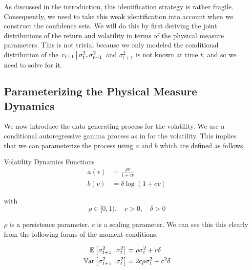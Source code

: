 \documentclass[11pt, letterpaper, twoside, final]{article}
\begin{document}
As discussed in the introduction, this identification strategy is rather fragile.
Consequently, we need to take this weak identification into account when we construct the confidence sets.
We will do this by first deriving the joint distributions of the return and volatility in terms of the physical
measure parameters.
This is not trivial because we only modeled the conditional distribution of the $\left. r_{t+1} \,\middle\vert\, \sigma^2_{t},
\sigma^2_{t+1} \right.$  and $\sigma^2_{t+1}$ is not known at time $t$, and so we need to solve for it.


\subsection{Parameterizing the Physical Measure Dynamics}

We now introduce the data generating process for the volatility.
We use a conditional autoregressive gamma process as in \textcite{gourieroux2006autoregressive, khrapov2016affine}
for the volatility.
This implies that we can parameterize the process using $a$ and $b$ which are defined as follows.

\begin{defn}{Volatility Dynamics Functions}
    \label{defn:physical_vol_dynamics}
    \begin{align}
        \label{defn:a_PP}
        a(v) &= \frac{\rho v}{1 + c v} \\
        \label{defn:b_PP}
        b(v) &= \delta \log(1 + c v)
    \end{align}
    
    with 
    \begin{equation}
        \rho \in [0,1), \quad c > 0, \quad \delta > 0
    \end{equation}

\end{defn}

$\rho$ is a persistence parameter.
$c$ is a scaling parameter.
We can see this this clearly from the following forms of the moment conditions.

\begin{remark} 
    \label{remark:vol_moment_conditions}
    \begin{align}
        \E\left[\sigma^2_{t+1} \mvert \sigma^2_t \right]  &= \rho \sigma^2_t  + c \delta\\
%
        \Var\left[\sigma^2_{t+1} \mvert \sigma^2_t \right]  &=  2 c \rho \sigma^2_t  + c^2
        \delta 
%
    \end{align}
\end{remark}
\end{document}
